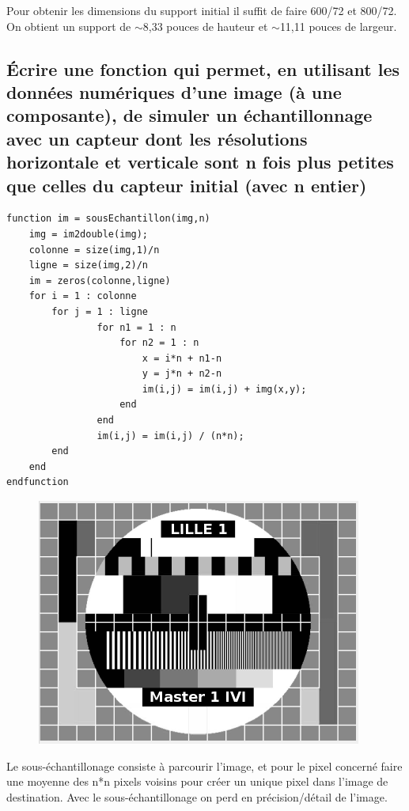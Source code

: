 \documentclass[a4paper,12pt]{report}
\begin{document}
\noindent Pour obtenir les dimensions du support initial il suffit de faire 600/72 et 800/72. On obtient un support de $\sim$8,33 pouces  de hauteur et $\sim$11,11
pouces de largeur.
\subsection*{Écrire une fonction qui permet, en utilisant les données numériques d'une image (à une composante), de simuler un échantillonnage avec un capteur dont les résolutions horizontale et verticale sont n fois plus petites que celles du capteur initial (avec n entier)}

\begin{lstlisting}
function im = sousEchantillon(img,n)
    img = im2double(img);
    colonne = size(img,1)/n
    ligne = size(img,2)/n
    im = zeros(colonne,ligne)
    for i = 1 : colonne
        for j = 1 : ligne
                for n1 = 1 : n
                    for n2 = 1 : n
                        x = i*n + n1-n
                        y = j*n + n2-n
                        im(i,j) = im(i,j) + img(x,y);
                    end
                end
                im(i,j) = im(i,j) / (n*n);
        end
    end
endfunction
\end{lstlisting}

\begin{figure}[!ht]
	\center
	\includegraphics[scale=0.5]{image/p22.png}
\end{figure}

\noindent Le sous-échantillonage consiste à parcourir l'image, et pour le pixel concerné faire une moyenne des n*n pixels voisins pour créer un unique pixel dans l'image de destination. Avec le sous-échantillonage on perd en précision/détail de l'image.
\end{document}
